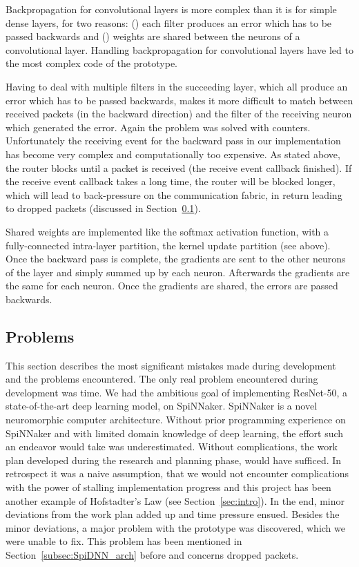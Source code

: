 \documentclass[]{article}
\begin{document}
Backpropagation for convolutional layers is more complex than it is
for simple dense layers, for two reasons: () each
filter produces an error which has to be passed backwards and
() weights are shared between the neurons of a
convolutional layer.
Handling backpropagation for convolutional layers have led to the
most complex code of the prototype.

Having to deal with multiple filters in the succeeding layer, which
all produce an error which has to be passed backwards, makes it more
difficult to match between received packets (in the backward
direction) and the filter of the receiving neuron which generated the
error.
Again the problem was solved with counters.
Unfortunately the receiving event for the backward pass in our
implementation has become very complex and computationally too
expensive.
As stated above, the router blocks until a packet is received
(the receive event callback finished).
If the receive event callback takes a long time, the router will be
blocked longer, which will lead to back-pressure on the communication
fabric, in return leading to dropped packets (discussed in
Section~\ref{subsec:problems}).

Shared weights are implemented like the softmax activation function,
with a fully-connected intra-layer partition, the kernel update
partition (see above).
Once the backward pass is complete, the gradients are sent to the
other neurons of the layer and simply summed up by each neuron.
Afterwards the gradients are the same for each neuron.
Once the gradients are shared, the errors are passed backwards.



\subsection{Problems} %
\label{subsec:problems}

This section describes the most significant mistakes made during
development and the problems encountered.
The only real problem encountered during development was time.
We had the ambitious goal of implementing ResNet-50, a
state-of-the-art deep learning model, on SpiNNaker.
SpiNNaker is a novel neuromorphic computer architecture.
Without prior programming experience on SpiNNaker and with limited
domain knowledge of deep learning, the effort such an endeavor would
take was underestimated.
Without complications, the work plan developed during the research and
planning phase, would have sufficed.
In retrospect it was a naive assumption, that we would not encounter
complications with the power of stalling implementation progress
and this project has been another example of Hofstadter's Law
(see Section~\ref{sec:intro}).
In the end, minor deviations from the work plan added up and time
pressure ensued.
Besides the minor deviations, a major problem with the prototype was
discovered, which we were unable to fix.
This problem has been mentioned in Section~\ref{subsec:SpiDNN_arch}
before and concerns dropped packets.
\end{document}

